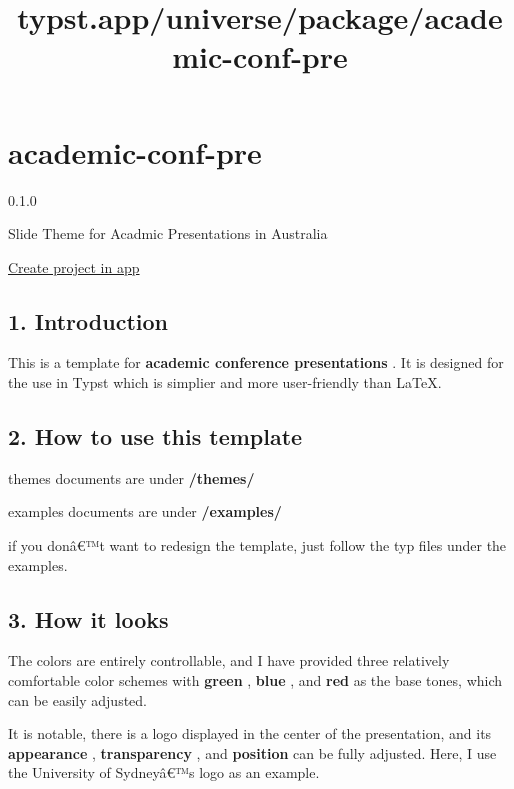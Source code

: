 \title{typst.app/universe/package/academic-conf-pre}

\label{banner}
\label{template-thumbnail}

\section{academic-conf-pre}\label{academic-conf-pre}

{ 0.1.0 }

Slide Theme for Acadmic Presentations in Australia

\href{/app?template=academic-conf-pre&version=0.1.0}{Create project in
app}

\label{readme}
\subsection{1. Introduction}\label{introduction}

This is a template for \textbf{academic conference presentations} . It
is designed for the use in Typst which is simplier and more
user-friendly than LaTeX.

\subsection{2. How to use this template}\label{how-to-use-this-template}

themes documents are under \textbf{/themes/}

examples documents are under \textbf{/examples/}

if you donâ€™t want to redesign the template, just follow the typ files
under the examples.

\subsection{3. How it looks}\label{how-it-looks}

The colors are entirely controllable, and I have provided three
relatively comfortable color schemes with \textbf{green} , \textbf{blue}
, and \textbf{red} as the base tones, which can be easily adjusted.

It is notable, there is a logo displayed in the center of the
presentation, and its \textbf{appearance} , \textbf{transparency} , and
\textbf{position} can be fully adjusted. Here, I use the University of
Sydneyâ€™s logo as an example.

